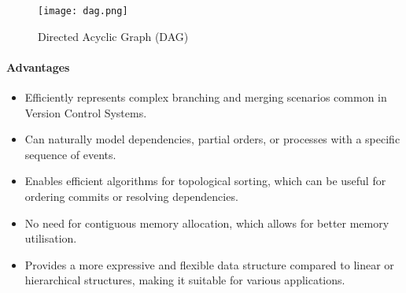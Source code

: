 \begin{figure}[!htbp]
    \centering
    \texttt{[image: dag.png]}
    \caption{Directed Acyclic Graph (DAG) \cite{surti_2016}}
    \label{fig:dag}
\end{figure}
\newpage

\paragraph{Advantages}
\begin{itemize}
    \item Efficiently represents complex branching and merging scenarios common in Version Control Systems.
    \item Can naturally model dependencies, partial orders, or processes with a specific sequence of events.
    \item Enables efficient algorithms for topological sorting, which can be useful for ordering commits or resolving dependencies.
    \item No need for contiguous memory allocation, which allows for better memory utilisation.
    \item Provides a more expressive and flexible data structure compared to linear or hierarchical structures, making it suitable for various applications.
\end{itemize}
